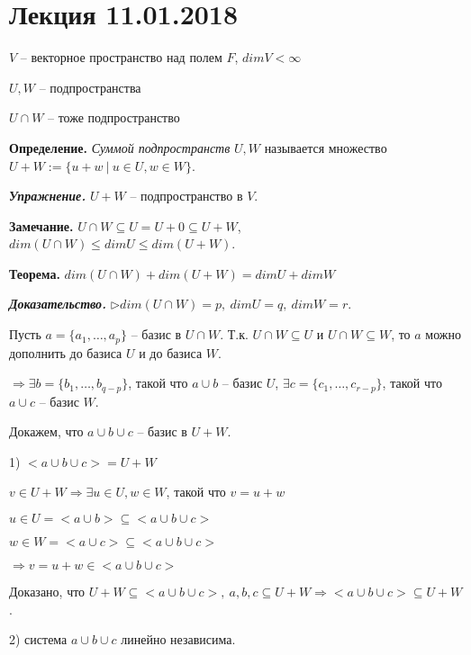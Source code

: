 \section{Лекция 11.01.2018}

$V$ -- векторное пространство над полем $F$, $dimV < \infty$

$U, W$ -- подпространства

$U \cap W$ -- тоже подпространство

\vspace{\baselineskip}
\textbf{Определение.} \textit{Суммой подпространств} $U, W$ называется множество $U + W := \{ u + w \ | \ u \in U, w \in W \}$.

\vspace{\baselineskip}
\textit{\textbf{Упражнение.}} $U + W$ -- подпространство в $V$.

\vspace{\baselineskip}
\textbf{Замечание.} $U \cap W \subseteq U = U + 0 \subseteq U + W$, $dim(U \cap W) \leq dimU \leq dim(U + W)$.

\vspace{\baselineskip}
\textbf{Теорема.} $dim(U \cap W) + dim(U + W) = dimU + dimW$

\vspace{\baselineskip}
\textbf{\textit{Доказательство.}} $\rhd dim(U \cap W) = p, \ dimU = q, \ dimW = r$. 

Пусть $a = \{a_1, \dots, a_p\}$ -- базис в $U \cap W$. Т.к. $U \cap W \subseteq U$ и $U \cap W \subseteq W$, то $a$ можно дополнить до базиса $U$ и до базиса $W$.

$\Rightarrow \exists b = \{b_1, \dots, b_{q-p}\}$, такой что $a \cup b$ -- базис $U$, $\exists c = \{c_1, \dots, c_{r-p}\}$, такой что $a \cup c$ -- базис $W$.

Докажем, что $a \cup b \cup c$ -- базис в $U + W$.

1) $<a \cup b \cup c> = U + W$

$v \in U + W \Rightarrow \exists u \in U, w \in W$, такой что $v = u + w$

$u \in U = <a \cup b> \subseteq <a \cup b \cup c>$

$w \in W = <a \cup c> \subseteq <a \cup b \cup c>$

$\Rightarrow v = u + w \in <a \cup b \cup c>$

Доказано, что $U + W \subseteq <a \cup b \cup c>, \ a, b, c \subseteq U + W \Rightarrow <a \cup b \cup c> \subseteq U + W$.

\vspace{\baselineskip}
2) система $a \cup b \cup c$ линейно независима. 

